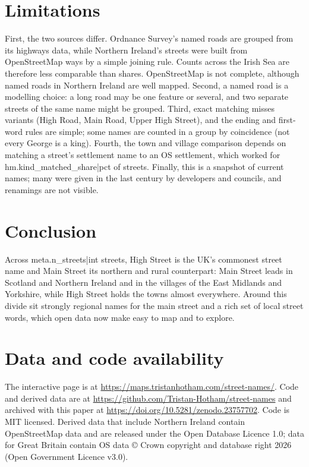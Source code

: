 \documentclass[11pt,a4paper]{article}
\begin{document}
\section{Limitations}

First, the two sources differ. Ordnance Survey's named roads are grouped from its highways data, while Northern Ireland's streets were built from OpenStreetMap ways by a simple joining rule. Counts across the Irish Sea are therefore less comparable than shares. OpenStreetMap is not complete, although named roads in Northern Ireland are well mapped. Second, a named road is a modelling choice: a long road may be one feature or several, and two separate streets of the same name might be grouped. Third, exact matching misses variants (High Road, Main Road, Upper High Street), and the ending and first-word rules are simple; some names are counted in a group by coincidence (not every George is a king). Fourth, the town and village comparison depends on matching a street's settlement name to an OS settlement, which worked for {{hm.kind_matched_share|pct}} of streets. Finally, this is a snapshot of current names; many were given in the last century by developers and councils, and renamings are not visible.

\section{Conclusion}

Across {{meta.n_streets|int}} streets, High Street is the UK's commonest street name and Main Street its northern and rural counterpart: Main Street leads in Scotland and Northern Ireland and in the villages of the East Midlands and Yorkshire, while High Street holds the towns almost everywhere. Around this divide sit strongly regional names for the main street and a rich set of local street words, which open data now make easy to map and to explore.

\section*{Data and code availability}

The interactive page is at \url{https://maps.tristanhotham.com/street-names/}. Code and derived data are at \url{https://github.com/Tristan-Hotham/street-names} and archived with this paper at \url{https://doi.org/10.5281/zenodo.23757702}. Code is MIT licensed. Derived data that include Northern Ireland contain OpenStreetMap data and are released under the Open Database Licence 1.0; data for Great Britain contain OS data © Crown copyright and database right 2026 (Open Government Licence v3.0).
\end{document}
